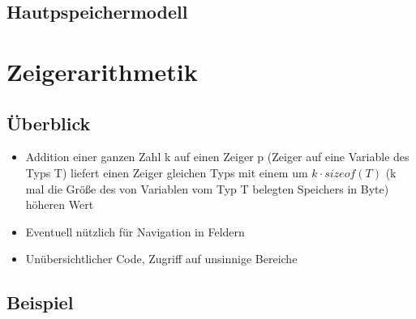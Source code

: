 \documentclass[16pt]{beamer}
\begin{document}
\subsection{Hautpspeichermodell}
\begin{frame}
\end{frame}

\section{Zeigerarithmetik}
\subsection{Überblick}
\begin{frame}
  \begin{itemize}
    \item Addition einer ganzen Zahl k auf einen Zeiger p (Zeiger auf eine Variable des Typs T) liefert einen Zeiger gleichen Typs mit einem um $k\cdot sizeof(T)$ (k mal die Größe des von Variablen vom Typ T belegten Speichers in Byte) höheren Wert
    \item Eventuell nützlich für Navigation in Feldern
    \item Unübersichtlicher Code, Zugriff auf unsinnige Bereiche
  \end{itemize}
\end{frame}

\subsection{Beispiel}
\begin{frame}
\end{frame}
\end{document}
